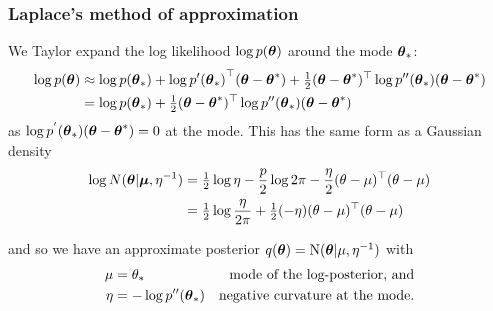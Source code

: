 \documentclass{beamer}
\begin{document}
\begin{frame}
	\frametitle{Laplace's method  of approximation}
	We Taylor expand the log likelihood $\log{p({\boldsymbol\theta})}$ around the mode
	${\boldsymbol \theta}_*$:
	\tiny
	\begin{align*}
		\log{p({\boldsymbol\theta})} & \approx \log{p({\boldsymbol\theta}_*)} + \log{p'({\boldsymbol\theta}_*)}^\top ({\boldsymbol \theta} - {\boldsymbol \theta}^*) + \tfrac{1}{2} ({\boldsymbol \theta} - {\boldsymbol \theta}^*)^\top \log{p''({\boldsymbol\theta}_*)}({\boldsymbol \theta} - {\boldsymbol \theta}^*) \\
		                 & = \log{p({\boldsymbol\theta}_*)} + \tfrac{1}{2} ({\boldsymbol \theta} - {\boldsymbol \theta}^*)^\top \log{p''({\boldsymbol\theta}_*)}({\boldsymbol \theta} - {\boldsymbol \theta}^*)                                                        
	\end{align*}
	\small
	as $\log{p^{'}({\boldsymbol\theta}_*)}({\boldsymbol \theta} - {\boldsymbol \theta}^*) = 0$ at the mode. This has
	the same form as a Gaussian density
	\begin{align*}
		\log{N({\boldsymbol\theta}|{\boldsymbol\mu}, \eta^{-1})} & = \tfrac{1}{2} \log{\eta} - \frac{p}{2} \log{2 \pi} - \frac{\eta}{2} (\theta-\mu)^\top (\theta-\mu) \\
		                                 & = \tfrac{1}{2} \log{\frac{\eta}{2\pi}} + \tfrac{1}{2} (-\eta)(\theta-\mu)^\top (\theta-\mu)                
	\end{align*}
	
	and so we have an approximate posterior $q({\boldsymbol \theta}) = \text{N}({\boldsymbol \theta}|\mu, \eta^{-1})$ with
	\begin{align*}
		\mu  & = \theta_*              & \text{mode of the log-posterior, and}  \\
		\eta & = -\log{p''({\boldsymbol\theta}_*)} & \text{negative curvature at the mode.} \\
	\end{align*}
\end{frame}
\end{document}

